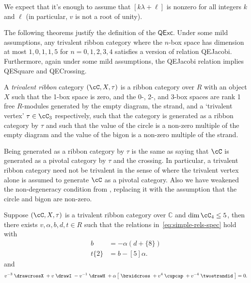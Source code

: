 \documentclass[12pt]{amsart}
\begin{document}
We expect that it's enough to assume that $[k \lambda + \ell]$ is nonzero for all integers $k$ and $\ell$ (in particular, $v$ is not a root of unity).

The following theorems justify the definition of the $\mathsf{QExc}$.  Under
some mild assumptions, any trivalent ribbon category where the $n$-box space
has dimension at most $1,0,1,1,5$ for $n=0,1,2,3,4$ satisfies a version of
relation QEJacobi.  Furthermore, again under some mild assumptions, the
QEJacobi relation implies QESquare and QECrossing.


\begin{definition}
A \emph{trivalent ribbon} category $(\cC, X, \tau)$ is a ribbon category over
$R$ with  an object $X$ such that
the 1-box space is zero, and the 0-, 2-, and 3-box spaces are rank 1 free $R$-modules
generated by the empty diagram, the strand, and a `trivalent vertex' $\tau \in \cC_3$ 
respectively, such that the category is
generated as a ribbon category by $\tau$ and such that the value of the circle
is a non-zero multiple of the empty diagram and the value of the bigon is a
non-zero multiple of the strand.
\end{definition}

Being generated as a ribbon category by $\tau$ is the same as saying that
$\cC$ is generated as a pivotal category by $\tau$ and the crossing.  In
particular, a trivalent ribbon category need not be trivalent in the sense of
\cite{MR3624901} where the trivalent vertex alone is assumed to generate $\cC$ 
as a pivotal category.  Also we have weakened the non-degeneracy condition from
\cite{MR3624901}, replacing it with the assumption that the circle and bigon
are non-zero.

\begin{theorem} \label{thm:Jacobi}
Suppose $(\cC, X, \tau)$ is a trivalent ribbon category over
$\mathbb{C}$ and $\dim{\cC_4} \leq 5$, then there exists $v, \alpha,
b, d, t \in R$ such that the relations in~\eqref{eq:simple-rels-spec}
hold with
\begin{align*}
  [5] b &= - \alpha (d+\{8\}) \\
  t \{2\} &= b-[5] \alpha.
\end{align*}
and
\begin{equation}
v^{-3} \;
\drawcrossX
\;+ v \;
\drawI
\; -v^{-1} \;
 \drawH
\;
 + \alpha
\left[\; \braidcross \;
 + v^{4}\;
\cupcap
\; + v^{-4} \;
 \twostrandid \;
 \right] = 0.\label{eq:quant-except-gen}
\end{equation}
\end{theorem}
\end{document}
